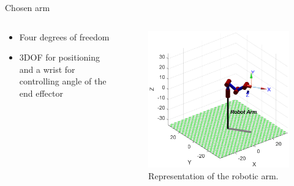 \documentclass{beamer}
\begin{document}


\begin{frame}{Chosen arm}

    \begin{columns}
        \begin{column}[]{0.5\textwidth}
            \begin{itemize}
                \item Four degrees of freedom
                \item 3DOF for positioning and a wrist for controlling angle of the end effector
            \end{itemize}
        \end{column}
        
        
        \begin{column}[]{0.5\textwidth}
            \begin{figure}
                \centering
                \hspace*{-0.25\textwidth}
                \includegraphics[width = 1.5\textwidth]{img/robotarm.eps}
                \caption{Representation of the robotic arm.}
            \end{figure}
            
        \end{column}
    \end{columns}
\end{frame}
\end{document}
